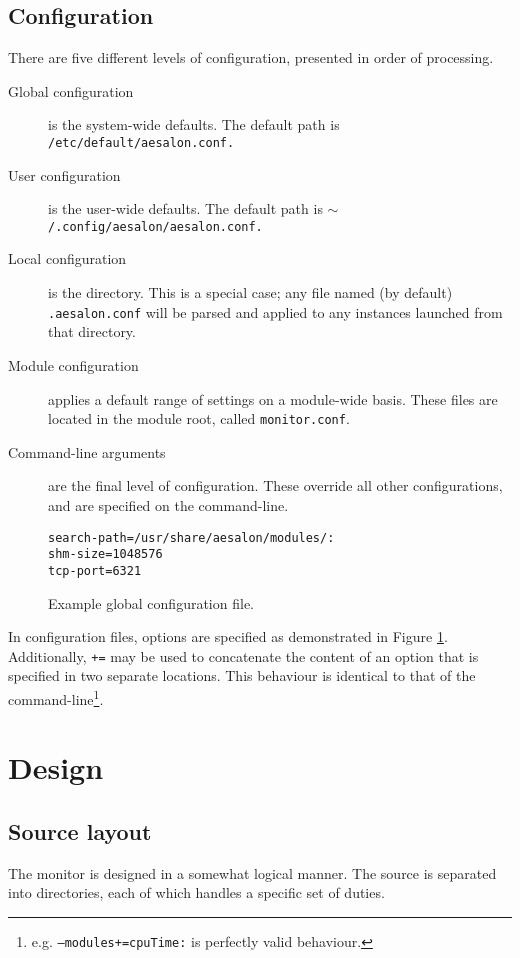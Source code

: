 \documentclass[a4paper,10pt]{report}
\begin{document}
\subsection{Configuration}
There are five different levels of configuration, presented in order of processing.
\begin{description}
 \item[Global configuration] is the system-wide defaults. The default path is \texttt{/etc/default/aesalon.conf.}
 \item[User configuration] is the user-wide defaults. The default path is \texttt{$\sim$/.config/aesalon/aesalon.conf.}
 \item[Local configuration] is the directory. This is a special case; any file named (by default) \texttt{.aesalon.conf}
  will be parsed and applied to any instances launched from that directory.
 \item[Module configuration] applies a default range of settings on a module-wide basis. These files are located in the module root, 
  called \texttt{monitor.conf}.
 \item[Command-line arguments] are the final level of configuration. These override all other configurations, and are specified
  on the command-line.
\end{description}

\begin{figure}[h]
 \caption{Example global configuration file.\label{exampleconfigfile}}
 \begin{verbatim}
search-path=/usr/share/aesalon/modules/:
shm-size=1048576
tcp-port=6321
 \end{verbatim}

\end{figure}

In configuration files, options are specified as demonstrated in Figure \ref{exampleconfigfile}. Additionally, \texttt{+=} may be used
to concatenate the content of an option that is specified in two separate locations. This behaviour is identical to that of the
command-line\footnote{e.g. \texttt{--modules+=cpuTime:} is perfectly valid behaviour.}.

\section{Design}
\subsection{Source layout}
The monitor is designed in a somewhat logical manner. The source is separated into directories, each of which handles a specific
set of duties.
\end{document}
